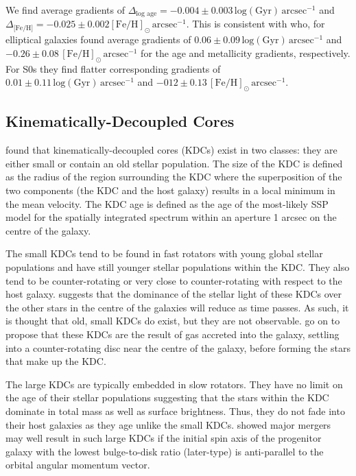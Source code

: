 			We find average gradients of $\Delta_\text{log age} = -0.004\pm0.003 \,\mathrm{log(Gyr) \, arcsec^{-1}}$ and $\Delta_\text{[Fe/H]} = -0.025\pm0.002 \mathrm{[Fe/H]_\odot \, arcsec^{-1}}$. This is consistent with \citet{Koleva2011} who, for elliptical galaxies found average gradients of $0.06\pm0.09 \, \mathrm{log(Gyr) \, arcsec^{-1}}$ and $-0.26\pm0.08 \, \mathrm{[Fe/H]_\odot \, arcsec^{-1}}$ for the age and metallicity gradients, respectively. For S0s they find flatter corresponding gradients of $0.01\pm0.11\, \mathrm{log(Gyr) \, arcsec^{-1}}$ and $-012\pm0.13\, \mathrm{[Fe/H]_\odot \, arcsec^{-1}}$. 




	\subsection{Kinematically-Decoupled Cores}
		\label{subsec:popKDC}

		\citet{Kuntschner2010} found that kinematically-decoupled cores (KDCs) exist in two classes: they are either small or contain an old stellar population. The size of the KDC is defined as the radius of the region surrounding the KDC where the superposition of the two components (the KDC and the host galaxy) results in a local minimum in the mean velocity. The KDC age is defined as the age of the most-likely SSP model for the spatially integrated spectrum within an aperture 1 arcsec on the centre of the galaxy.

		The small KDCs tend to be found in fast rotators with young global stellar populations and have still younger stellar populations within the KDC. They also tend to be counter-rotating or very close to counter-rotating with respect to the host galaxy. \citet{Kuntschner2010} suggests that the dominance of the stellar light of these KDCs over the other stars in the centre of the galaxies will reduce as time passes. As such, it is thought that old, small KDCs do exist, but they are not observable. \citet{Kuntschner2010} go on to propose that these KDCs are the result of gas accreted into the galaxy, settling into a counter-rotating disc near the centre of the galaxy, before forming the stars that make up the KDC. 

		The large KDCs are typically embedded in slow rotators. They have no limit on the age of their stellar populations suggesting that the stars within the KDC dominate in total mass as well as surface brightness. Thus, they do not fade into their host galaxies as they age unlike the small KDCs. \citet{Bois2011} showed major mergers may well result in such large KDCs if the initial spin axis of the progenitor galaxy with the lowest bulge-to-disk ratio (later-type) is anti-parallel to the orbital angular momentum vector. 

